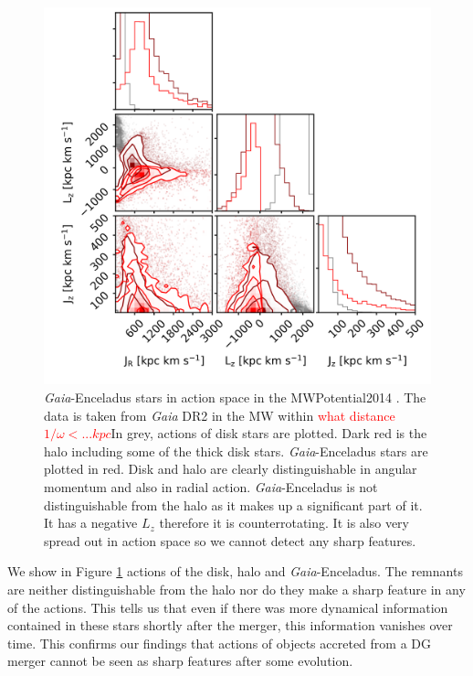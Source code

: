 \begin{figure}[htbp]
    \centering
    \includegraphics[width=1.0\textwidth]{plots/Discussion/Gaia_all_actions_MW14_talk3.png}
    \caption{\textit{Gaia}-Enceladus stars in action space in the MWPotential2014 \citep{Bovy...galpy...2015}. The data is taken from \textit{Gaia} DR2 \citep{GaiaDR2...overview...2018} in the \ac{MW} within \textcolor{red}{what distance $1/\omega <...kpc$}In grey, actions of disk stars are plotted. Dark red is the halo including some of the thick disk stars. \textit{Gaia}-Enceladus stars are plotted in red. Disk and halo are clearly distinguishable in angular momentum and also in radial action. \textit{Gaia}-Enceladus is not distinguishable from the halo as it makes up a significant part of it. It has a negative $L_z$ therefore it is counterrotating. It is also very spread out in action space so we cannot detect any sharp features.}
    \label{fig:Gaia_Enceladus_actions}
\end{figure}
We show in Figure \ref{fig:Gaia_Enceladus_actions} actions of the disk, halo and \textit{Gaia}-Enceladus. The remnants are neither distinguishable from the halo nor do they make a sharp feature in any of the actions. This tells us that even if there was more dynamical information contained in these stars shortly after the merger, this information vanishes over time. This confirms our findings that actions of objects accreted from a \ac{DG} merger cannot be seen as sharp features after some evolution. 



